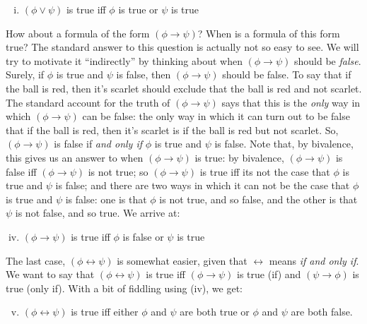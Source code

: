 \begin{enumerate}[\thesection.1]
\begin{enumerate}[(i)]
				\item $(\phi\lor\psi)$ is true iff $\phi$ is true or $\psi$ is true							
				\end{enumerate}
			How about a formula of the form $(\phi\to\psi)$?
			When is a formula of this form true?
			The standard answer to this question is actually not so easy to see.
			We will try to motivate it ``indirectly'' by thinking about when $(\phi\to\psi)$ should be \emph{false}.
			Surely, if $\phi$ is true and $\psi$ is false, then $(\phi\to\psi)$ should be false.
			To say that if the ball is red, then it's scarlet should exclude that the ball is red and not scarlet.
			The standard account for the truth of $(\phi\to\psi)$ says that this is the \emph{only} way in which $(\phi\to\psi)$ can be false: the only way in which it can turn out to be false that if the ball is red, then it's scarlet is if the ball is red but not scarlet.
			So, $(\phi\to\psi)$ is false if \emph{and only if} $\phi$ is true and $\psi$ is false.
			Note that, by bivalence, this gives us an answer to when $(\phi\to\psi)$ is true: by bivalence, $(\phi\to\psi)$ is false iff $(\phi\to\psi)$ is not true; so $(\phi\to\psi)$ is true iff its not the case that $\phi$ is true and $\psi$ is false; and there are two ways in which it can not be the case that $\phi$ is true and $\psi$ is false: one is that $\phi$ is not true, and so false, and the other is that $\psi$ is not false, and so true.
			We arrive at:
				\begin{enumerate}[(i)]
				\setcounter{enumii}{3}	
				\item $(\phi\to\psi)$ is true iff $\phi$ is false or $\psi$ is true							
				\end{enumerate}
The last case, $(\phi\leftrightarrow\psi)$ is somewhat easier, given that $\leftrightarrow$ means \emph{if and only if}. We want to say that $(\phi\leftrightarrow\psi)$ is true iff $(\phi\to\psi)$ is true (if) and $(\psi\to\phi)$ is true (only if). With a bit of fiddling using (iv), we get:
 		\begin{enumerate}[(i)]
				\setcounter{enumii}{4}	
				\item $(\phi\leftrightarrow\psi)$ is true iff either $\phi$ and $\psi$ are both true or $\phi$ and $\psi$ are both false.			
		\end{enumerate} 		
		

\end{enumerate}
